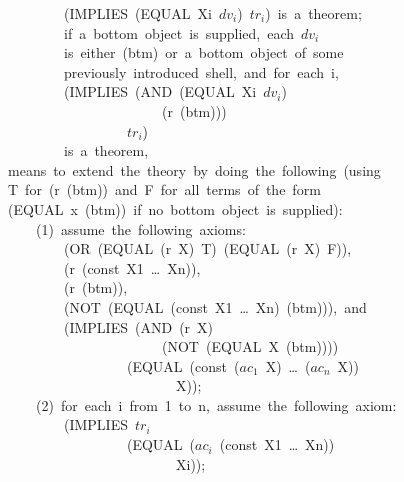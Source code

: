 \documentclass[11pt]{book}
\newenvironment{pubasis}{\begin{flushleft}\ttfamily\small}{\normalsize\rmfamily\end{flushleft}}
\begin{document}
\begin{pubasis}
~~~~~~~~~~~~~~~~(IMPLIES~(EQUAL~Xi~$dv_{i}$)~$tr_{i}$)~is~a~theorem;\\

~~~~~~~~~~~~~~~~if~a~bottom~object~is~supplied,~each~$dv_{i}$\\
~~~~~~~~~~~~~~~~is~either~(btm)~or~a~bottom~object~of~some\\
~~~~~~~~~~~~~~~~previously~introduced~shell,~and~for~each~i,\\

~~~~~~~~~~~~~~~~(IMPLIES~(AND~(EQUAL~Xi~$dv_{i}$)\\
~~~~~~~~~~~~~~~~~~~~~~~~~~~~~~(r~(btm)))\\
~~~~~~~~~~~~~~~~~~~~~~~~~$tr_{i}$)\\

~~~~~~~~~~~~~~~~is~a~theorem,\\

~~~~~~~~means~to~extend~the~theory~by~doing~the~following~(using\\
~~~~~~~~T~for~(r~(btm))~and~F~for~all~terms~of~the~form\\
~~~~~~~~(EQUAL~x~(btm))~if~no~bottom~object~is~supplied):\\

~~~~~~~~~~~~(1)~assume~the~following~axioms:\\

~~~~~~~~~~~~~~~~(OR~(EQUAL~(r~X)~T)~(EQUAL~(r~X)~F)),\\

~~~~~~~~~~~~~~~~(r~(const~X1~\ldots{}~Xn)),\\

~~~~~~~~~~~~~~~~(r~(btm)),\\

~~~~~~~~~~~~~~~~(NOT~(EQUAL~(const~X1~\ldots{}~Xn)~(btm))),~and\\

~~~~~~~~~~~~~~~~(IMPLIES~(AND~(r~X)\\
~~~~~~~~~~~~~~~~~~~~~~~~~~~~~~(NOT~(EQUAL~X~(btm))))\\
~~~~~~~~~~~~~~~~~~~~~~~~~(EQUAL~(const~($ac_{1}$~X)~\ldots{}~($ac_{n}$~X))\\
~~~~~~~~~~~~~~~~~~~~~~~~~~~~~~~~X));\\

~~~~~~~~~~~~(2)~for~each~i~from~1~to~n,~assume~the~following~axiom:\\

~~~~~~~~~~~~~~~~(IMPLIES~$tr_{i}$\\
~~~~~~~~~~~~~~~~~~~~~~~~~(EQUAL~($ac_{i}$~(const~X1~\ldots{}~Xn))\\
~~~~~~~~~~~~~~~~~~~~~~~~~~~~~~~~Xi));\\


\end{pubasis}
\end{document}
